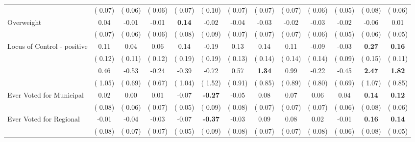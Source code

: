 \begin{tabular}{l c c c c c c c c c c c c}
& (     0.07) & (     0.06) & (     0.06) & (     0.07) & (     0.10) & (     0.07) & (     0.07) & (     0.07) & (     0.06) & (     0.05) & (     0.08) & (     0.06) \\
Overweight &      0.04 &     -0.01 &     -0.01 & \textbf{      0.14 } &     -0.02 &     -0.04 &     -0.03 &     -0.02 &     -0.03 &     -0.02 &     -0.06 &      0.01 \\
& (     0.07) & (     0.06) & (     0.06) & (     0.08) & (     0.09) & (     0.07) & (     0.07) & (     0.07) & (     0.06) & (     0.05) & (     0.06) & (     0.05) \\
Locus of Control - positive &      0.11 &      0.04 &      0.06 &      0.14 &     -0.19 &      0.13 &      0.14 &      0.11 &     -0.09 &     -0.03 & \textbf{     0.27} & \textbf{     0.16} \\
& (     0.12) & (     0.11) & (     0.12) & (     0.19) & (     0.19) & (     0.13) & (     0.14) & (     0.14) & (     0.14) & (     0.09) & (     0.15) & (     0.11) \\
&      0.46 &     -0.53 &     -0.24 &     -0.39 &     -0.72 &      0.57 & \textbf{      1.34 } &      0.99 &     -0.22 &     -0.45 & \textbf{     2.47} & \textbf{     1.82} \\
& (     1.05) & (     0.69) & (     0.67) & (     1.04) & (     1.52) & (     0.91) & (     0.85) & (     0.89) & (     0.80) & (     0.69) & (     1.07) & (     0.85) \\
Ever Voted for Municipal &      0.02 &      0.00 &      0.01 &     -0.07 & \textbf{     -0.27 } &     -0.05 &      0.08 &      0.07 &      0.06 &      0.04 & \textbf{     0.14} & \textbf{     0.12} \\
& (     0.08) & (     0.06) & (     0.07) & (     0.05) & (     0.09) & (     0.08) & (     0.07) & (     0.07) & (     0.07) & (     0.06) & (     0.08) & (     0.06) \\
Ever Voted for Regional &     -0.01 &     -0.04 &     -0.03 &     -0.07 & \textbf{     -0.37 } &     -0.03 &      0.09 &      0.08 &      0.02 &     -0.01 & \textbf{     0.16} & \textbf{     0.14} \\
& (     0.08) & (     0.07) & (     0.07) & (     0.05) & (     0.09) & (     0.08) & (     0.07) & (     0.07) & (     0.08) & (     0.06) & (     0.08) & (     0.05) \\
\bottomrule
\end{tabular}
